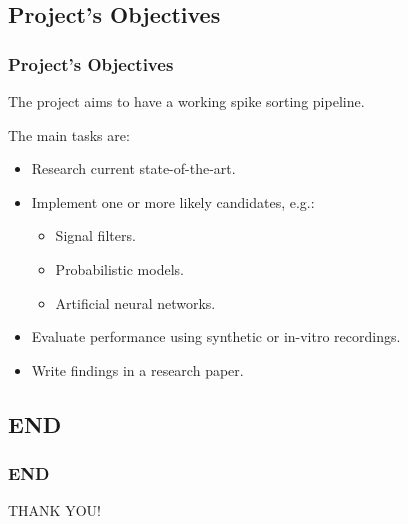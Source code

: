 \documentclass[11pt]{beamer}
\begin{document}
	\begin{frame}
		\section{Project's Objectives}
		\frametitle{Project's Objectives}
		The project aims to have a working spike sorting pipeline.

		The main tasks are:
		\begin{itemize}
			\item Research current state-of-the-art.
			\item Implement one or more likely candidates, e.g.:
			\begin{itemize}
				\item Signal filters.
				\item Probabilistic models.
				\item Artificial neural networks.
			\end{itemize}
			\item Evaluate performance using synthetic or in-vitro recordings.
			\item Write findings in a research paper.
		\end{itemize}
	\end{frame}
	\begin{frame}
		\section{END}
		\frametitle{END}
		THANK YOU!
	\end{frame}
	
\end{document}
